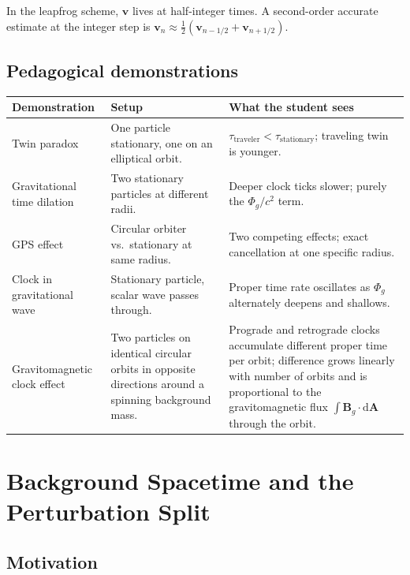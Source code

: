 \documentclass[11pt,a4paper]{article}
\newcommand{\vv}[1]{\mathbf{#1}}
\newcommand{\Phig}{\Phi_g}
\newcommand{\dd}{\mathrm{d}}
\begin{document}
In the leapfrog scheme, $\vv{v}$ lives at half-integer times.  A second-order accurate estimate at the integer step is $\vv{v}_n \approx \tfrac{1}{2}(\vv{v}_{n-1/2}+\vv{v}_{n+1/2})$.

\subsection{Pedagogical demonstrations}

\begin{center}
\begin{tabular}{@{}L{3.5cm}L{4cm}L{5.5cm}@{}}
\toprule
\textbf{Demonstration} & \textbf{Setup} & \textbf{What the student sees} \\
\midrule
Twin paradox & One particle stationary, one on an elliptical orbit. & $\tau_{\mathrm{traveler}} < \tau_{\mathrm{stationary}}$; traveling twin is younger. \\[4pt]
Gravitational time dilation & Two stationary particles at different radii. & Deeper clock ticks slower; purely the $\Phig/c^2$ term. \\[4pt]
GPS effect & Circular orbiter vs.\ stationary at same radius. & Two competing effects; exact cancellation at one specific radius. \\[4pt]
Clock in gravitational wave & Stationary particle, scalar wave passes through. & Proper time rate oscillates as $\Phig$ alternately deepens and shallows. \\[4pt]
Gravitomagnetic clock effect & Two particles on identical circular orbits in opposite directions around a spinning background mass. & Prograde and retrograde clocks accumulate different proper time per orbit; difference grows linearly with number of orbits and is proportional to the gravitomagnetic flux $\int\vv{B}_g\cdot\dd\vv{A}$ through the orbit. \\
\bottomrule
\end{tabular}
\end{center}

\section{Background Spacetime and the Perturbation Split}

\subsection{Motivation}
\end{document}
